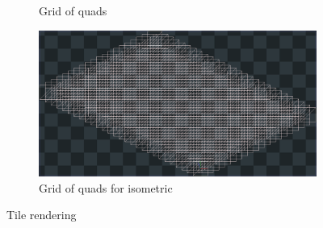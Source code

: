 \documentclass{article}
\begin{document}
\begin{figure}[H]
\begin{subfigure}{.30\textwidth}
  \caption{Grid of quads}
  \label{fig:sub2}
\end{subfigure}%
\begin{subfigure}{.30\textwidth}
  \centering
  \includegraphics[width=1.0\linewidth]{images/isoRender.png}
  \caption{Grid of quads for isometric}
  \label{fig:sub3}
\end{subfigure}
\caption{Tile rendering}
\label{fig:test}
\end{figure}
\end{document}
